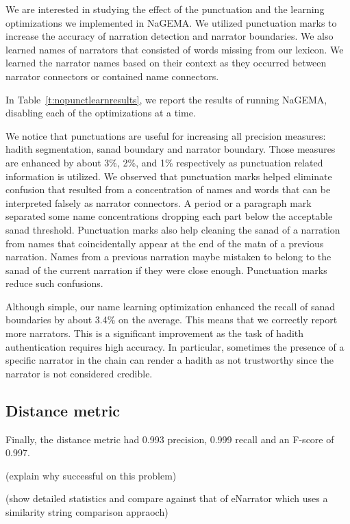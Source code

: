 \documentclass[11pt]{article}
\begin{document}
We are interested in studying the effect of the punctuation 
and the learning optimizations we implemented in NaGEMA.
We utilized punctuation marks to increase the accuracy of narration detection and narrator boundaries. 
We also learned names of narrators that consisted of words missing from 
our lexicon.
We learned the narrator names based on their context as they occurred 
between narrator connectors or contained name connectors. 

In Table~\ref{t:nopunctlearnresults}, we report the results of running NaGEMA, 
disabling each of the optimizations at a time.

We notice that punctuations are useful for increasing all precision measures: hadith segmentation, sanad boundary and
narrator boundary. Those measures are enhanced by about 
3\%, 2\%, and 1\% respectively as punctuation related 
information is utilized.  
We observed that punctuation marks helped eliminate confusion that resulted from a 
concentration of names and words that 
can be interpreted falsely as narrator connectors. 
A period or a paragraph mark separated some name concentrations 
dropping each part below the acceptable sanad threshold. 
Punctuation marks also help cleaning the sanad of a narration from 
names that coincidentally appear at the 
end of the matn of a previous narration. 
Names from a previous narration maybe mistaken to belong to the sanad of the current 
narration if they were close enough. 
Punctuation marks reduce such confusions.


Although simple, our name learning optimization enhanced the recall 
of sanad boundaries by about 3.4\% on the average.
This means that we correctly report more narrators.
This is a significant improvement as the task of hadith authentication requires high accuracy. 
In particular, sometimes the presence of a specific narrator in the chain can render a 
hadith as not trustworthy since the narrator is not considered credible.

\subsection{Distance metric}
Finally, the distance metric had 0.993 precision,
0.999 recall and an F-score of 0.997.

(explain why successful on this problem)

(show detailed statistics and compare against that of eNarrator which uses a similarity string comparison appraoch)
\end{document}
